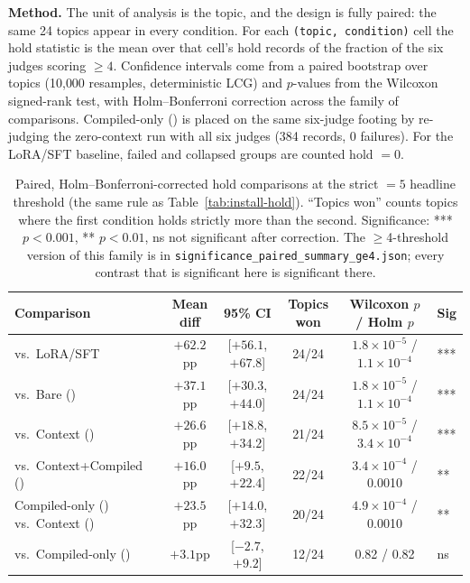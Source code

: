 \textbf{Method.} The unit of analysis is the topic, and the design is fully paired: the
same 24 topics appear in every condition. For each \texttt{(topic, condition)} cell the
hold statistic is the mean over that cell's hold records of the fraction of the six judges
scoring $\ge 4$. Confidence intervals come from a paired bootstrap over topics (10{,}000
resamples, deterministic LCG) and $p$-values from the Wilcoxon signed-rank test, with
Holm--Bonferroni correction across the family of comparisons. Compiled-only (\condC{}) is
placed on the same six-judge footing by re-judging the  zero-context
run with all six judges (384 records, 0 failures). For the LoRA/SFT baseline, failed and
collapsed groups are counted hold $=0$.

\begin{table}[h]
\centering
\caption{Paired, Holm--Bonferroni-corrected hold comparisons at the strict \(=5\) headline
threshold (the same rule as Table~\ref{tab:install-hold}). ``Topics won'' counts topics
where the first condition holds strictly more than the second. Significance: *** $p<0.001$,
** $p<0.01$, ns not significant after correction. The \(\ge\)4-threshold version of this
family is in \texttt{significance\_paired\_summary\_ge4.json}; every contrast that is
significant here is significant there.}
\label{tab:significance}
\begin{tabular}{lccccl}
\toprule
Comparison & Mean diff & 95\% CI & Topics won & Wilcoxon $p$ / Holm $p$ & Sig \\
\midrule
\condF{} vs.\ LoRA/SFT & $+62.2$pp & [$+56.1$, $+67.8$] & 24/24 & $1.8\times10^{-5}$ / $1.1\times10^{-4}$ & *** \\
\condF{} vs.\ Bare (\condA{}) & $+37.1$pp & [$+30.3$, $+44.0$] & 24/24 & $1.8\times10^{-5}$ / $1.1\times10^{-4}$ & *** \\
\condF{} vs.\ Context (\condB{}) & $+26.6$pp & [$+18.8$, $+34.2$] & 21/24 & $8.5\times10^{-5}$ / $3.4\times10^{-4}$ & *** \\
\condF{} vs.\ Context+Compiled (\condD{}) & $+16.0$pp & [$+9.5$, $+22.4$] & 22/24 & $3.4\times10^{-4}$ / 0.0010 & ** \\
Compiled-only (\condC{}) vs.\ Context (\condB{}) & $+23.5$pp & [$+14.0$, $+32.3$] & 20/24 & $4.9\times10^{-4}$ / 0.0010 & ** \\
\condF{} vs.\ Compiled-only (\condC{}) & $+3.1$pp & [$-2.7$, $+9.2$] & 12/24 & 0.82 / 0.82 & ns \\
\bottomrule
\end{tabular}
\end{table}

